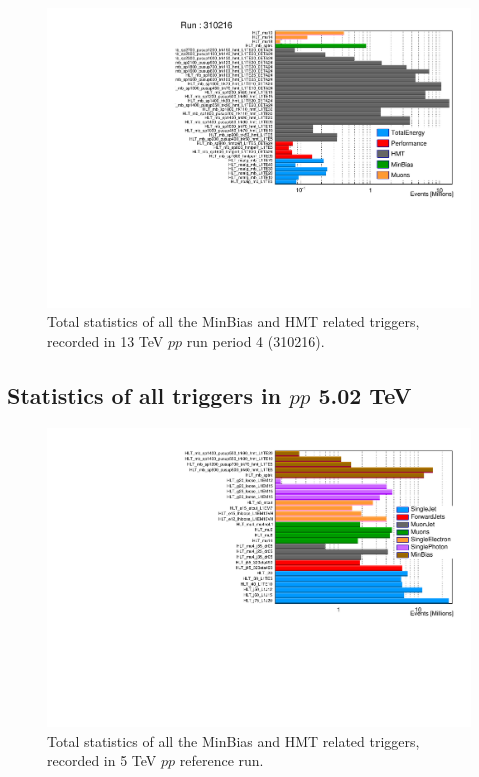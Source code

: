 \begin{figure}[H]
\centering
\includegraphics[width=.9\linewidth]{figs/sec_evtSlc/stat_pp13_run4_3.pdf}
\caption{Total statistics of all the MinBias and HMT related triggers, recorded in 13 TeV $pp$ run period 4 (310216).}
\label{fig:stat_pp13_run4}
\end{figure}



\subsection{Statistics of all triggers in $pp$ 5.02 TeV}
\begin{figure}[H]
\centering
\includegraphics[width=.9\linewidth]{figs/sec_evtSlc/stat_pp5.pdf}
\caption{Total statistics of all the MinBias and HMT related triggers, recorded in 5 TeV $pp$ reference run.}
\label{fig:stat_pp5}
\end{figure}



